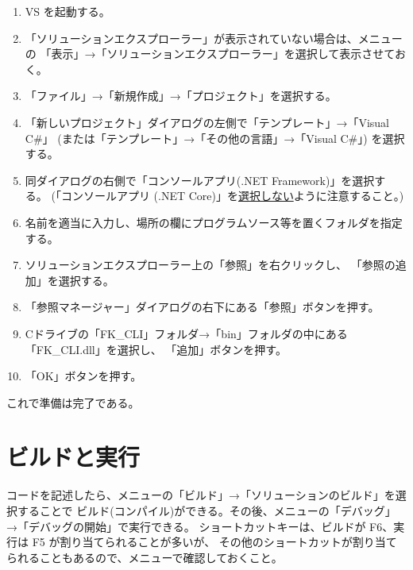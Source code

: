 \documentclass[a4paper]{jsarticle}
\begin{document}
\begin{enumerate}

 \item VS を起動する。

 \item 「ソリューションエクスプローラー」が表示されていない場合は、メニューの
	「表示」→「ソリューションエクスプローラー」を選択して表示させておく。

 \item 「ファイル」→「新規作成」→「プロジェクト」を選択する。

 \item 「新しいプロジェクト」ダイアログの左側で「テンプレート」→「Visual C\#」
	(または「テンプレート」→「その他の言語」→「Visual C\#」) を選択する。

 \item 同ダイアログの右側で「コンソールアプリ(.NET Framework)」を選択する。
	(「コンソールアプリ (.NET Core)」を\underline{選択しない}ように注意すること。)

 \item 名前を適当に入力し、場所の欄にプログラムソース等を置くフォルダを指定する。

 \item ソリューションエクスプローラー上の「参照」を右クリックし、
	「参照の追加」を選択する。

 \item 「参照マネージャー」ダイアログの右下にある「参照」ボタンを押す。

 \item Cドライブの「FK\_CLI」フォルダ→「bin」フォルダの中にある「FK\_CLI.dll」を選択し、
	「追加」ボタンを押す。

 \item 「OK」ボタンを押す。

\end{enumerate}

これで準備は完了である。

\section{ビルドと実行}

コードを記述したら、メニューの「ビルド」→「ソリューションのビルド」を選択することで
ビルド(コンパイル)ができる。その後、メニューの「デバッグ」→「デバッグの開始」で実行できる。
ショートカットキーは、ビルドが F6、実行は F5 が割り当てられることが多いが、
その他のショートカットが割り当てられることもあるので、メニューで確認しておくこと。
\end{document}
